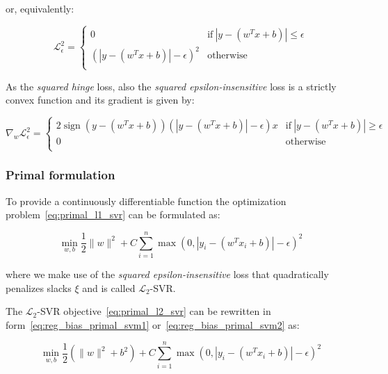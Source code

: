 or, equivalently:

\begin{equation} \label{eq:squared_eps_loss2}
	\mathcal{L}_\epsilon^2 = 
	\begin{cases}
		0 & \text{if} \ |y - (w^T x + b)| \leq \epsilon \\
		(|y - (w^T x + b)| - \epsilon)^2 & \text{otherwise} \\
	\end{cases}
\end{equation}

As the \emph{squared hinge} loss, also the \emph{squared epsilon-insensitive} loss is a strictly convex function and its gradient is given by:


\begin{equation} \label{eq:squared_eps_loss_der}
	\nabla_w \mathcal{L}_\epsilon^2=
		\begin{cases}
            \displaystyle 2 \operatorname{sign}(y - (w^T x + b)) (|y - (w^T x + b)| - \epsilon) x & \text{if} \ |y - (w^T x + b)| \geq \epsilon \\
            0 & \text{otherwise} \\ 
        \end{cases}
\end{equation}

\subsubsection{Primal formulation}

To provide a continuously differentiable function the optimization problem~\eqref{eq:primal_l1_svr} can be formulated as:

\begin{equation} \label{eq:primal_l2_svr}
    \min_{w,b} \frac{1}{2} \| w \|^2 + C \sum_{i=1}^n \max(0, |y_i - (w^T x_i + b)| - \epsilon)^2
\end{equation}

where we make use of the \emph{squared epsilon-insensitive} loss that quadratically penalizes slacks $\xi$ and is called $\mathcal{L}_2$-SVR.

The $\mathcal{L}_2$-SVR objective~\eqref{eq:primal_l2_svr} can be rewritten in form~\eqref{eq:reg_bias_primal_svm1} or~\eqref{eq:reg_bias_primal_svm2} as:

\begin{equation} \label{eq:reg_bias_primal_l2_svr}
	\min_{w,b} \frac{1}{2} (\| w \|^2 + b^2) + C \sum_{i=1}^n \max(0, |y_i - (w^T x_i + b)| - \epsilon)^2
\end{equation}

